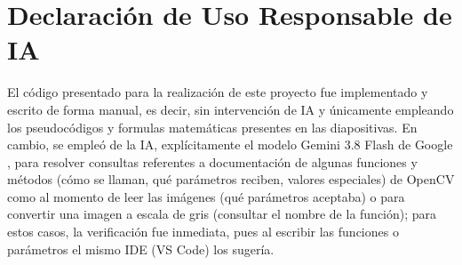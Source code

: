 \section{Declaración de Uso Responsable de IA}
    El código presentado para la realización de este proyecto 
    fue implementado y escrito de forma manual, es decir, sin 
    intervención de IA y únicamente empleando los pseudocódigos 
    y formulas matemáticas presentes en las diapositivas. 
    En cambio, se empleó de la IA, explícitamente el modelo 
    Gemini 3.8 Flash de Google \parencite{google_gemini_3_8_flash}, 
    para resolver consultas referentes a documentación 
    de algunas funciones y métodos (cómo se llaman, qué parámetros 
    reciben, valores especiales) de OpenCV como al momento de leer 
    las imágenes (qué parámetros aceptaba) o para convertir una 
    imagen a escala de gris (consultar el nombre de la función); para 
    estos casos, la verificación fue inmediata, pues al escribir las 
    funciones o parámetros el mismo IDE (VS Code) los sugería. 